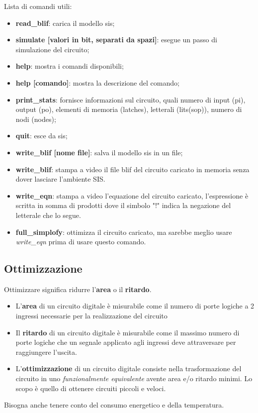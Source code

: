 \documentclass[a4paper]{article}
\theoremstyle{break}
\theoremstyle{break}
\theoremstyle{break}
\theoremstyle{break}
\begin{document}
Lista di comandi utili: 
\begin{itemize}
    \item \textbf{read\_blif}: carica il modello sis;
    \item \textbf{simulate [valori in bit, separati da spazi]}: esegue un passo di
        simulazione del circuito;
    \item \textbf{help}: mostra i comandi disponibili;
    \item \textbf{help [comando]}: mostra la descrizione del comando;
    \item \textbf{print\_stats}: fornisce informazioni sul circuito, quali numero di input
       (pi), output (po), elementi di memoria (latches), letterali (lits(sop)), numero di nodi (nodes);
    \item \textbf{quit}: esce da sis;
    \item \textbf{write\_blif [nome file]}: salva il modello sis in un file;
    \item \textbf{write\_blif}: stampa a video il file blif del circuito caricato in memoria
        senza dover lasciare l'ambiente SIS.
    \item \textbf{write\_eqn}: stampa a video l'equazione del circuito caricato, l'espressione è scritta
        in somma di prodotti dove il simbolo "!" indica la negazione del letterale che lo segue.
    \item \textbf{full\_simplofy}: ottimizza il circuito caricato, ma sarebbe meglio usare
        \emph{write\_eqn} prima di usare questo comando.
\end{itemize}

\subsection{Ottimizzazione}
Ottimizzare significa ridurre l'\textbf{area} o il \textbf{ritardo}.
\begin{itemize}
    \item L'\textbf{area} di un circuito digitale è misurabile come il numero di porte logiche a 2 ingressi
        necessarie per la realizzazione del circuito
    \item Il \textbf{ritardo} di un circuito digitale è misurabile come il massimo numero di porte logiche
        che un segnale applicato agli ingressi deve attraversare per raggiungere l'uscita.
    \item L'\textbf{ottimizzazione} di un circuito digitale consiste nella trasformazione del circuito in uno
        \emph{funzionalmente equivalente} avente area e/o ritardo minimi. Lo scopo è quello di ottenere
        circuiti piccoli e veloci.
\end{itemize}
Bisogna anche tenere conto del consumo energetico e della temperatura.
\end{document}
